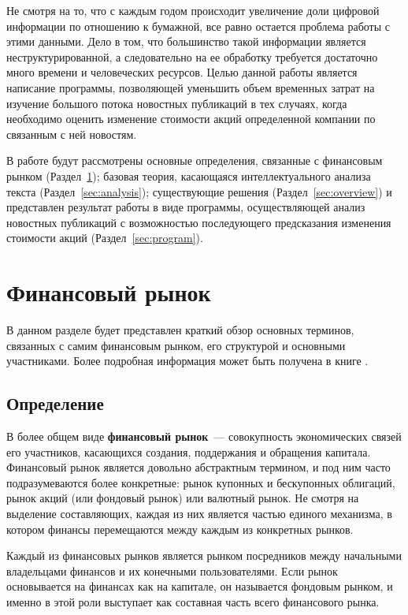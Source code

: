 \documentclass[14pt]{matmex-diploma-custom}
\begin{document}
Не смотря на то, что с каждым годом происходит увеличение доли цифровой информации по отношению к бумажной, все равно остается проблема работы с этими данными. Дело в том, что большинство такой информации является неструктурированной, а следовательно на ее обработку требуется достаточно много времени и человеческих ресурсов. Целью данной работы является написание программы, позволяющей уменьшить объем временных затрат на изучение большого потока новостных публикаций в тех случаях, когда необходимо оценить изменение стоимости акций определенной компании по связанным с ней новостям.

В работе будут рассмотрены основные определения, связанные с финансовым рынком (Раздел~\ref{sec:finance}); базовая теория, касающаяся интеллектуального анализа текста (Раздел~\ref{sec:analysis}); существующие решения (Раздел~\ref{sec:overview}) и представлен результат работы в виде программы, осуществляющей анализ новостных публикаций с возможностью последующего предсказания изменения стоимости акций (Раздел~\ref{sec:program}).

\clearpage\section{Финансовый рынок}

\label{sec:finance}

В данном разделе будет представлен краткий обзор основных терминов, связанных с самим финансовым рынком, его структурой и основными участниками. Более подробная информация может быть получена в книге \cite{book:financial_market}.

\subsection{Определение}

В более общем виде \textbf{финансовый рынок}~--- совокупность экономических связей его участников, касающихся создания, поддержания и обращения капитала. Финансовый рынок является довольно абстрактным термином, и под ним часто подразумеваются более конкретные: рынок купонных и бескупонных облигаций, рынок акций (или фондовый рынок) или валютный рынок. Не смотря на выделение составляющих, каждая из них является частью единого механизма, в котором финансы перемещаются между каждым из конкретных рынков.

Каждый из финансовых рынков является рынком посредников между начальными владельцами финансов и их конечными пользователями. Если рынок основывается на финансах как на капитале, он называется фондовым рынком, и именно в этой роли выступает как составная часть всего финансового рынка.
\end{document}
